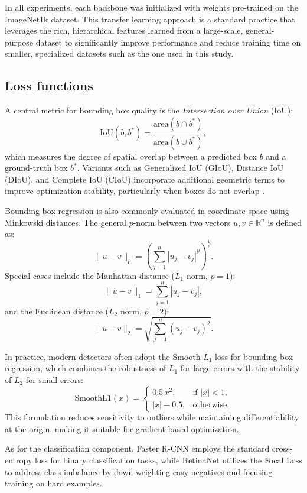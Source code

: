 In all experiments, each backbone was initialized with weights pre-trained on the ImageNet1k dataset. This transfer learning approach is a standard practice that leverages the rich, hierarchical features learned from a large-scale, general-purpose dataset to significantly improve performance and reduce training time on smaller, specialized datasets such as the one used in this study. 

\subsection{Loss functions}
\label{sec:loss_functions}
A central metric for bounding box quality is the \textit{Intersection over Union} (IoU):
$$
\mathrm{IoU}(b, b^\ast) = \frac{\mathrm{area}(b \cap b^\ast)}{\mathrm{area}(b \cup b^\ast)},
$$
which measures the degree of spatial overlap between a predicted box $b$ and a ground-truth box $b^\ast$.
Variants such as Generalized IoU (GIoU), Distance IoU (DIoU), and Complete IoU (CIoU) incorporate additional geometric terms to improve optimization stability, particularly when boxes do not overlap \cite{rezatofighi2019giou,zheng2019diou, zheng2021ciou}.


Bounding box regression is also commonly evaluated in coordinate space using Minkowski distances.
The general $p$-norm between two vectors $u,v \in \mathbb{R}^n$ is defined as:
$$
\| u - v \|_p = \left( \sum_{j=1}^n |u_j - v_j|^p \right)^{\frac{1}{p}}.
$$
Special cases include the Manhattan distance ($L_1$ norm, $p=1$):
$$
\| u - v \|_1 = \sum_{j=1}^n |u_j - v_j|,
$$
and the Euclidean distance ($L_2$ norm, $p=2$):
$$
\| u - v \|_2 = \sqrt{\sum_{j=1}^n (u_j - v_j)^2}.
$$

In practice, modern detectors often adopt the Smooth-$L_1$ loss \cite{girshick2015fastrcnn} for bounding box regression, which combines the robustness of $L_1$ for large errors with the stability of $L_2$ for small errors:
$$
\mathrm{SmoothL1}(x) =
\begin{cases}
0.5\,x^2, & \text{if } |x| < 1, \\
|x| - 0.5, & \text{otherwise}.
\end{cases}
$$
This formulation reduces sensitivity to outliers while maintaining differentiability at the origin, making it suitable for gradient-based optimization.

As for the classification component, Faster R-CNN employs the standard cross-entropy loss for binary classification tasks, while RetinaNet utilizes the Focal Loss \cite{lin2018focalloss} to address class imbalance by down-weighting easy negatives and focusing training on hard examples.

